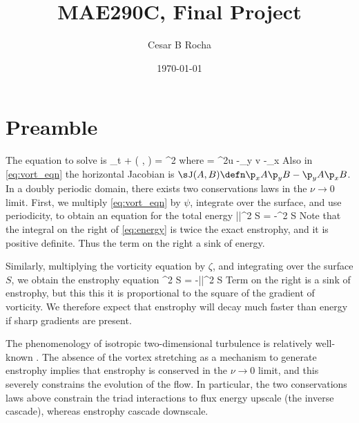\documentclass[11pt]{article}
\title{MAE290C, Final Project}
\author{Cesar B Rocha}
\date{\today}
\begin{document}

\maketitle

\section*{Preamble}
The equation to solve is
\beq
\label{eq:vort_eqn}
\p_t \zeta + \sJ\left( \psi, \zeta \right ) = \nu \nabla^2 \zeta\com
\eeq
where
\beq
\label{eq:defns}
\zeta = \nabla^2\psi \com\qquad u  -\p_y \psi\com\qqand v  -\p_x \psi\per
\eeq
Also in \eqref{eq:vort_eqn} the horizontal Jacobian is $\sJ(A,B)\defn \p_x A \p_y B - \p_y A\p_x B$. In a doubly periodic domain, there exists two conservations laws in the $\nu\to 0$ limit. First,
we multiply \eqref{eq:vort_eqn} by $\psi$, integrate over the surface, and use periodicity, to obtain an equation
for the total energy
\beq
\label{eq:energy}
 \int \int \half |\nabla\psi|^2 \dd S = -\nu \int \int  \zeta^2 \dd S\per
\eeq
Note that the integral on the right of \eqref{eq:energy} is twice the exact enstrophy, and
it is positive definite. Thus the term on the right a sink of energy. 

Similarly,  multiplying the vorticity equation by $\zeta$, and integrating over the surface $S$, we obtain
the enstrophy equation
\beq
{}\int\int \half \zeta^2 \dd S = -\nu \int \int |\nabla \zeta|^2 \dd S\per
\eeq
Term on the right is a sink of enstrophy, but this this it is proportional to the square of
the gradient of vorticity. We therefore expect that  enstrophy will decay much faster than
energy if sharp gradients are present.

The phenomenology of isotropic two-dimensional turbulence is relatively well-known \citep[e.g.,][]{pedlosky1987}. The absence of
the vortex stretching as a mechanism to generate enstrophy implies that enstrophy is conserved in the
$\nu \to 0$ limit, and this severely constrains the evolution of the flow. In particular, the two
conservations laws above constrain the triad interactions to flux energy upscale (the inverse cascade), 
whereas enstrophy cascade downscale.
\end{document}
